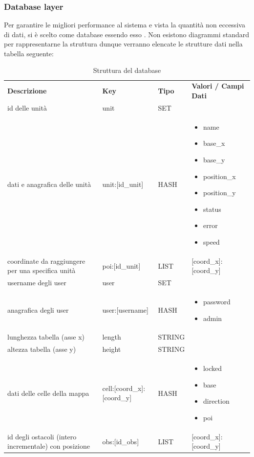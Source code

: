 	\subsubsection{Database layer}
		Per garantire le migliori performance al sistema e vista la quantità non eccessiva di dati, si è scelto  come database essendo esso . Non esistono diagrammi standard per rappresentarne la struttura dunque verranno elencate le strutture dati nella tabella seguente:
		
		\begin{table} [h!]
			\begin{center}
				\begin{tabular} { m{6cm} m{4cm} m{2cm} m{4cm}}
					\rowcolor{lightgray}
					\textbf{Descrizione} & \textbf{Key} & \textbf{Tipo} & \textbf{Valori / Campi Dati}\\
					id delle unità & unit & SET & \\
					dati e anagrafica delle unità & unit:[id\_unit] & HASH & 
						\begin{itemize}
							\item name
							\item base\_x
							\item base\_y
							\item position\_x
							\item position\_y
							\item status
							\item error
							\item speed
						\end{itemize}\\
					coordinate \glock{POI} da raggiungere per una specifica unità & poi:[id\_unit] & LIST & [coord\_x]:[coord\_y]\\
					username degli user & user & SET & \\
					anagrafica degli user & user:[username] & HASH & 
						\begin{itemize}
							\item password
							\item admin
						\end{itemize}\\
					lunghezza tabella (asse x) & length & STRING & \\
					altezza tabella (asse y) & height & STRING & \\
					dati delle celle della mappa & cell:[coord\_x]:[coord\_y] & HASH & 
						\begin{itemize}
							\item locked
							\item base
							\item direction
							\item poi
						\end{itemize}\\
					id degli ostacoli (intero incrementale) con posizione & obs:[id\_obs] & LIST & [coord\_x]:[coord\_y]\\
				\end{tabular}
				\caption{Struttura del database }
			\end{center}
		\end{table}
	
